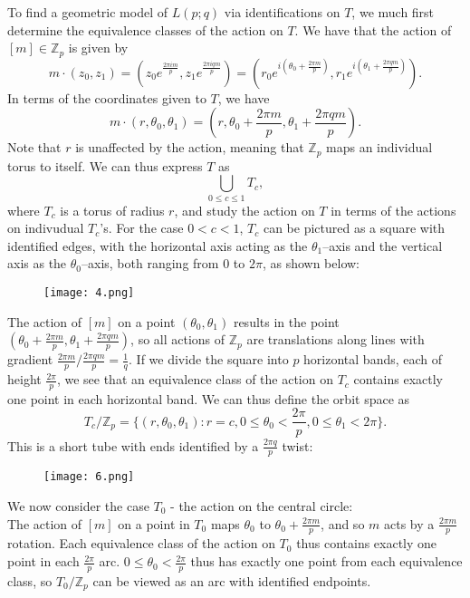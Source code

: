 \documentclass{article}
\begin{document}
\noindent To find a geometric model of $L(p;q)$ via identifications on $T$, we much first determine the equivalence classes of the action on $T$. We have that the action of $[m]\in\mathbb{Z}_p$ is given by \[m\cdot(z_0,z_1)=(z_0e^{\frac{2\pi im}{p}},z_1e^{\frac{2\pi iqm}{p}})=(r_0e^{i(\theta_0+\frac{2\pi m}{p})},r_1e^{i(\theta_1+\frac{2\pi qm}{p})}).\] In terms of the coordinates given to $T$, we have\[m\cdot(r,\theta_0,\theta_1)=(r,\theta_0+\frac{2\pi m}{p},\theta_1+\frac{2\pi qm}{p}).\] Note that $r$ is unaffected by the action, meaning that $\mathbb{Z}_p$ maps an individual torus to itself. We can thus express $T$ as\[\bigcup_{0\leq c\leq 1}T_c,\] where $T_c$ is a torus of radius $r$, and study the action on $T$ in terms of the actions on indivudual $T_c$'s.
For the case $0<c<1$, $T_c$ can be pictured as a square with identified edges, with the horizontal axis acting as the $\theta_1$--axis and the vertical axis as the $\theta_0$--axis, both ranging from $0$ to $2\pi$, as shown below:
\begin{figure}[hbt!]
    \centering
    \texttt{[image: 4.png]}
\end{figure}


\noindent The action of $[m]$ on a point $(\theta_0,\theta_1)$ results in the point $(\theta_0+\frac{2\pi m}{p},\theta_1+\frac{2\pi qm}{p})$, so all actions of $\mathbb{Z}_p$ are translations along lines with gradient $\frac{2\pi m}{p}/\frac{2\pi qm}{p}=\frac{1}{q}$. If we divide the square into $p$ horizontal bands, each of height $\frac{2\pi}{p}$, we see that an equivalence class of the action on $T_c$ contains exactly one point in each horizontal band. We can thus define the orbit space as \[T_c/\mathbb{Z}_p=\{(r,\theta_0,\theta_1):r=c,0\leq\theta_0<\frac{2\pi}{p},0\leq\theta_1<2\pi\}.\] This is a short tube with ends identified by a $\frac{2\pi q}{p}$ twist:

\begin{figure} [hbt!]
    \centering
    \texttt{[image: 6.png]}
\end{figure}


\noindent We now consider the case $T_0$ - the action on the central circle:\\
The action of $[m]$ on a point in $T_0$ maps $\theta_0$ to $\theta_0+\frac{2\pi m}{p}$, and so $m$ acts by a $\frac{2\pi m}{p}$ rotation. Each equivalence class of the action on $T_0$ thus contains exactly one point in each $\frac{2\pi}{p}$ arc. $0\leq\theta_0<\frac{2\pi}{p}$ thus has exactly one point from each equivalence class, so $T_0/\mathbb{Z}_p$ can be viewed as an arc with identified endpoints.\\
\end{document}
